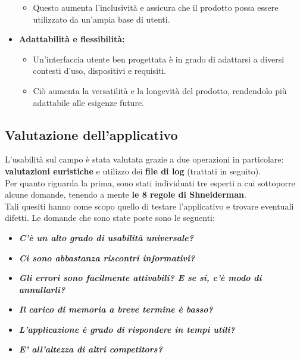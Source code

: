\documentclass{article}
\begin{document}
\begin{itemize}
\begin{itemize}
			\item Questo aumenta l'inclusività e assicura che il prodotto possa essere utilizzato da un'ampia base di utenti.
		\end{itemize}
		\item \textbf{Adattabilità e flessibilità:}
		\begin{itemize}
			\item Un'interfaccia utente ben progettata è in grado di adattarsi a diversi contesti d'uso, dispositivi e requisiti.
			\item Ciò aumenta la versatilità e la longevità del prodotto, rendendolo più adattabile alle esigenze future.
		\end{itemize}
	\end{itemize}
		\subsection{Valutazione dell'applicativo}
		L'usabilità sul campo è stata valutata grazie a due operazioni in particolare: \textbf{valutazioni euristiche} e utilizzo dei \textbf{file di log} (trattati in seguito).\\
		Per quanto riguarda la prima, sono stati individuati tre esperti a cui sottoporre alcune domande, tenendo a mente \textbf{le 8 regole di Shneiderman}.\\
		Tali quesiti hanno come scopo quello di testare l'applicativo e trovare eventuali difetti.
		Le domande che sono state poste sono le seguenti:
		\begin{itemize}
			\item \textbf{\textit{\textcolor{dark_purple}{C'è un alto grado di usabilità universale?}}}
			\item \textbf{\textit{\textcolor{dark_purple}{Ci sono abbastanza riscontri informativi?}}}
			\item \textbf{\textit{\textcolor{dark_purple}{Gli errori sono facilmente attivabili? E se si, c'è modo di annullarli?}}}
			\item \textbf{\textit{\textcolor{dark_purple}{Il carico di memoria a breve termine è basso?}}}
			\item \textbf{\textit{\textcolor{dark_purple}{L'applicazione è grado di rispondere in tempi utili?}}}
			\item \textbf{\textit{\textcolor{dark_purple}{E' all'altezza di altri competitors?}}}
		\end{itemize}
\end{document}

